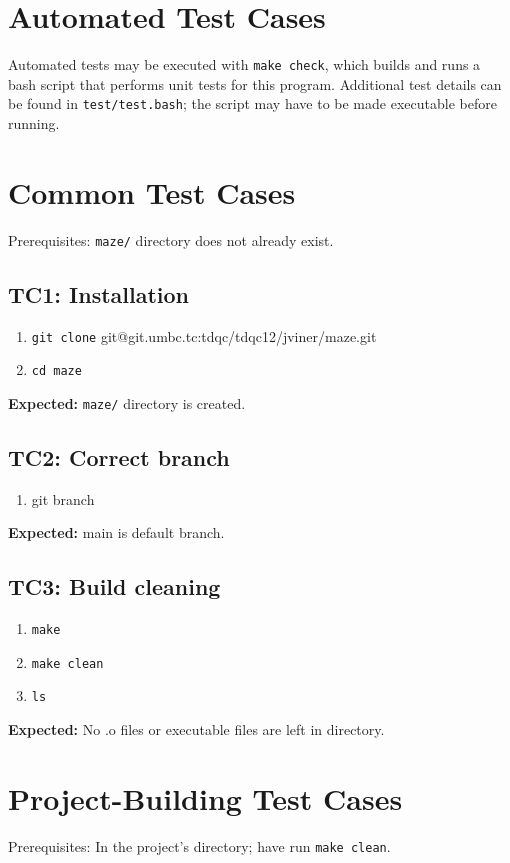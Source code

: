 \documentclass[11pt]{report}
\begin{document}
\section*{Automated Test Cases}
Automated tests may be executed with {\texttt{\color{red}make check}}, which builds and runs a bash script that performs unit tests for this program. Additional test details can be found in {\texttt{\color{red}test/test.bash}}; the script may have to be made executable before running.
\pagebreak
\section*{Common Test Cases}
Prerequisites: {\texttt{\color{red}maze/}} directory does not already exist.
\subsection*{TC1: Installation}
\begin{enumerate}
  \item {\texttt{\color{red}git clone} {\color{blue}git@git.umbc.tc}}{\color{red}:tdqc/tdqc12/jviner/maze.git}
  \item {\texttt{\color{red}cd maze}}
\end{enumerate}
\textbf{Expected:} {\texttt{\color{red}maze/}} directory is created.
\subsection*{TC2: Correct branch}
\begin{enumerate}
  \item {\color{red}git branch}
\end{enumerate}
\textbf{Expected:} {\color{red}main} is default branch.
\subsection*{TC3: Build cleaning}
\begin{enumerate}
  \item {\texttt{\color{red}make}}
  \item {\texttt{\color{red}make clean}}
  \item {\texttt{\color{red}ls}}
\end{enumerate}
\textbf{Expected:} No .o files or executable files are left in directory.
\pagebreak
\section*{Project-Building Test Cases}
Prerequisites: In the project's directory; have run {\texttt{\color{red}make clean}}.
\end{document}
